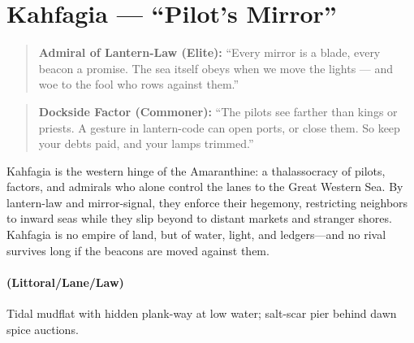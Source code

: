 \section{Kahfagia --- ``Pilot's Mirror''}
\label{chap:kahfagia}

\begin{quote}
  \textbf{Admiral of Lantern-Law (Elite):}  
  ``Every mirror is a blade, every beacon a promise. The sea itself obeys when we move the lights — and woe to the fool who rows against them.''
  \end{quote}
  
  \begin{quote}
  \textbf{Dockside Factor (Commoner):}  
  ``The pilots see farther than kings or priests. A gesture in lantern-code can open ports, or close them. So keep your debts paid, and your lamps trimmed.''
  \end{quote}

\begin{tcolorbox}[colback=black!3,colframe=black!40!white,title={Theme \& Atmosphere}]
Kahfagia is the western hinge of the Amaranthine: a thalassocracy of pilots, factors, and admirals who alone control the lanes to the Great Western Sea. By lantern-law and mirror-signal, they enforce their hegemony, restricting neighbors to inward seas while they slip beyond to distant markets and stranger shores. Kahfagia is no empire of land, but of water, light, and ledgers---and no rival survives long if the beacons are moved against them.
\end{tcolorbox}

\paragraph*{(Littoral/Lane/Law)} Tidal mudflat with hidden plank-way at low water; salt-scar pier behind dawn spice auctions.

